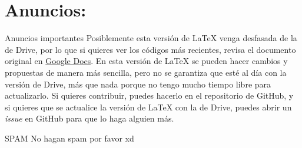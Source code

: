 \section{Anuncios:}
\begin{myquote}{Anuncios importantes}
    Posiblemente esta versión de LaTeX venga desfasada de la de Drive, por lo que si quieres ver los códigos más recientes, revisa el documento original en \href{https://docs.google.com/document/d/1o8UgQYTTjpBznUktuLK0WDKmX9nV4Ao2UIWs1MJQ2-s/edit?tab=t.0}{Google Docs}. En esta versión de LaTeX se pueden hacer cambios y propuestas de manera más sencilla, pero no se garantiza que esté al día con la versión de Drive, más que nada porque no tengo mucho tiempo libre para actualizarlo. Si quieres contribuir, puedes hacerlo en el repositorio de GitHub, y si quieres que se actualice la versión de LaTeX con la de Drive, puedes abrir un \emph{issue} en GitHub para que lo haga alguien más.
\end{myquote}

\begin{myquote}{SPAM}
    No hagan spam por favor xd
\end{myquote}